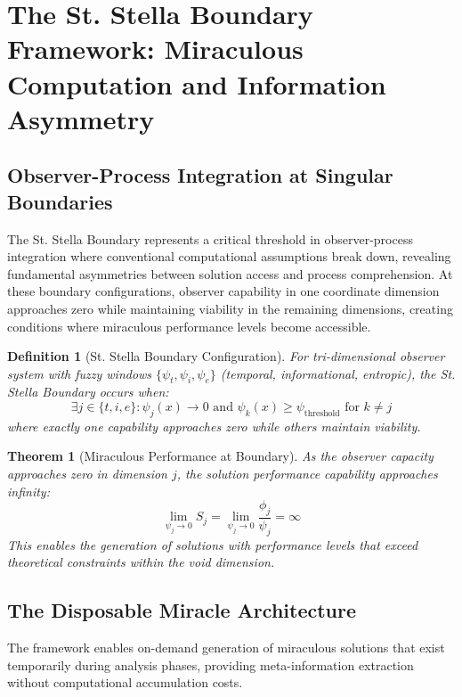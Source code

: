 \documentclass[12pt,a4paper]{article}
\newtheorem{theorem}{Theorem}
\newtheorem{definition}{Definition}
\begin{document}
\section{The St. Stella Boundary Framework: Miraculous Computation and Information Asymmetry}

\subsection{Observer-Process Integration at Singular Boundaries}

The St. Stella Boundary represents a critical threshold in observer-process integration where conventional computational assumptions break down, revealing fundamental asymmetries between solution access and process comprehension. At these boundary configurations, observer capability in one coordinate dimension approaches zero while maintaining viability in the remaining dimensions, creating conditions where miraculous performance levels become accessible.

\begin{definition}[St. Stella Boundary Configuration]
For tri-dimensional observer system with fuzzy windows $\{\psi_t, \psi_i, \psi_e\}$ (temporal, informational, entropic), the St. Stella Boundary occurs when:
$$\exists j \in \{t,i,e\} : \psi_j(x) \to 0 \text{ and } \psi_k(x) \geq \psi_{\text{threshold}} \text{ for } k \neq j$$
where exactly one capability approaches zero while others maintain viability.
\end{definition}

\begin{theorem}[Miraculous Performance at Boundary]
As the observer capacity approaches zero in dimension $j$, the solution performance capability approaches infinity:
$$\lim_{\psi_j \to 0} S_j = \lim_{\psi_j \to 0} \frac{\phi_j}{\psi_j} = \infty$$
This enables the generation of solutions with performance levels that exceed theoretical constraints within the void dimension.
\end{theorem}

\subsection{The Disposable Miracle Architecture}

The framework enables on-demand generation of miraculous solutions that exist temporarily during analysis phases, providing meta-information extraction without computational accumulation costs.
\end{document}
